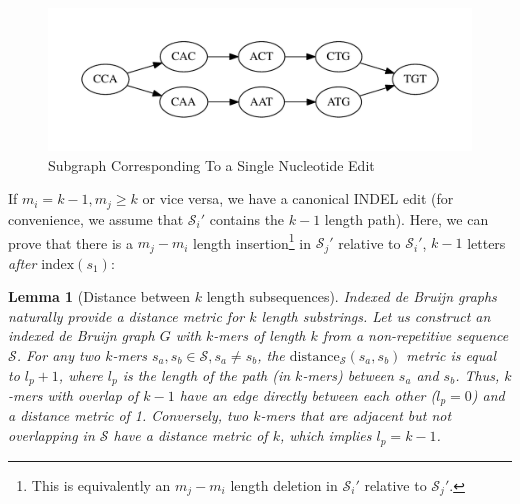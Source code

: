 \documentclass{bioinfo}
\newtheorem{lemma}{Lemma}
\begin{document}
\begin{methods}
\begin{figure}[h]
\begin{center}
\includegraphics[width=0.95\linewidth, clip=true, trim=0 39 0 39]{graphs/sne.pdf}
\end{center}
\caption{Subgraph Corresponding To a Single Nucleotide Edit}
\label{fig:sne}
\end{figure}

If $m_i = k - 1, m_j \ge k$ or vice versa, we have a canonical INDEL edit (for convenience, we assume
that $\mathcal{S}_i'$ contains the $k - 1$ length path). Here, we can prove that there is a $m_j - m_i$
length insertion\footnote{This is equivalently an $m_j - m_i$ length deletion in $\mathcal{S}_i'$ relative to
$\mathcal{S}_j'$.} in $\mathcal{S}_j'$ relative to $\mathcal{S}_i'$, $k - 1$ letters \emph{after}
$\text{index}(s_1)$:

\begin{lemma}[Distance between $k$ length subsequences]
\label{lem:minimum-distance}
\emph{Indexed de Bruijn} graphs naturally provide a distance metric for $k$ length substrings. Let us construct an
indexed de Bruijn graph $G$ with $k$-mers of length $k$ from a non-repetitive sequence $\mathcal{S}$.
For any two $k$-mers $s_a, s_b \in \mathcal{S}, s_a \ne s_b$, the
$\text{distance}_\mathcal{S}(s_a, s_b)$ metric is equal to $l_p + 1$, where $l_p$ is the length of the
path (in $k$-mers) between $s_a$ and $s_b$. Thus, $k$-mers with overlap of $k - 1$ have an edge
directly between each other ($l_p = 0$) and a distance metric of 1. Conversely, two $k$-mers that are
adjacent but not overlapping in $\mathcal{S}$ have a distance metric of $k$, which implies $l_p = k - 1$.
\end{lemma}


\end{methods}
\end{document}
